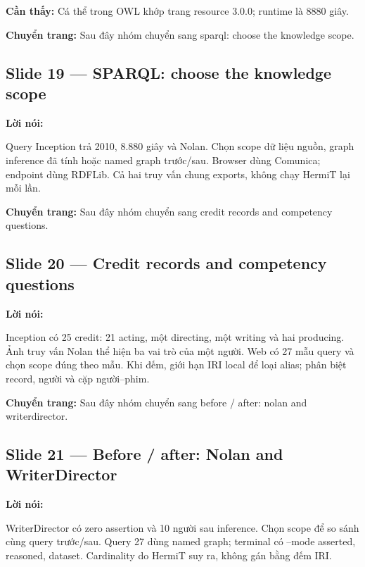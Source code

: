 \documentclass[
  11pt,
]{article}
\begin{document}
\textbf{Cần thấy:} Cá thể trong OWL khớp trang resource 3.0.0; runtime
là 8880 giây.

\textbf{Chuyển trang:} Sau đây nhóm chuyển sang sparql: choose the
knowledge scope.

\subsection{Slide 19 --- SPARQL: choose the knowledge
scope}\label{slide-19-sparql-choose-the-knowledge-scope}

\textbf{Lời nói:}

Query Inception trả 2010, 8.880 giây và Nolan. Chọn scope dữ liệu nguồn,
graph inference đã tính hoặc named graph trước/sau. Browser dùng
Comunica; endpoint dùng RDFLib. Cả hai truy vấn chung exports, không
chạy HermiT lại mỗi lần.

\textbf{Chuyển trang:} Sau đây nhóm chuyển sang credit records and
competency questions.

\subsection{Slide 20 --- Credit records and competency
questions}\label{slide-20-credit-records-and-competency-questions}

\textbf{Lời nói:}

Inception có 25 credit: 21 acting, một directing, một writing và hai
producing. Ảnh truy vấn Nolan thể hiện ba vai trò của một người. Web có
27 mẫu query và chọn scope đúng theo mẫu. Khi đếm, giới hạn IRI local để
loại alias; phân biệt record, người và cặp người--phim.

\textbf{Chuyển trang:} Sau đây nhóm chuyển sang before / after: nolan
and writerdi\allowbreak{}rector.\allowbreak{}

\subsection{\texorpdfstring{Slide 21 --- Before / after: Nolan and
Writer\allowbreak{}Di\allowbreak{}rector}{Slide 21 --- Before / after: Nolan and }}\label{slide-21-before-after-nolan-and-writerdirector}

\textbf{Lời nói:}

Writer\allowbreak{}Di\allowbreak{}rector có zero assertion và 10 người
sau inference. Chọn scope để so sánh cùng query trước/sau. Query 27 dùng
named graph; terminal có --mode asserted, reasoned, dataset. Cardinality
do HermiT suy ra, không gán bằng đếm IRI.
\end{document}
